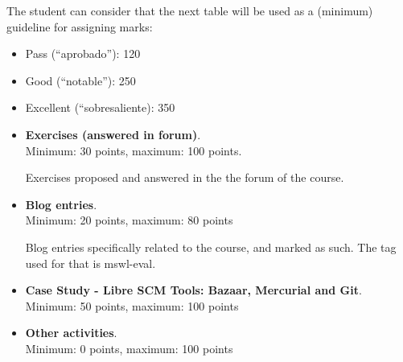 \documentclass[a4paper]{article}
\begin{document}
The student can consider that the next table will be used as a (minimum) guideline for 
assigning marks:

\begin{itemize}
\item Pass (``aprobado''): 120
\item Good (``notable''): 250
\item Excellent (``sobresaliente): 350
\end{itemize}

\begin{itemize}
\item \textbf{Exercises (answered in forum)}. \\
  Minimum: 30 points, maximum: 100 points.

  Exercises proposed and answered in the the forum of the course.

\item \textbf{Blog entries}. \\
  Minimum: 20 points, maximum: 80 points

  Blog entries specifically related to the course, and marked as such. The tag used for that is mswl-eval.

\item \textbf{Case Study - Libre SCM Tools: Bazaar, Mercurial and Git}. \\
  Minimum: 50 points, maximum: 100 points

\item \textbf{Other activities}. \\
  Minimum: 0 points, maximum: 100 points

\end{itemize}
\end{document}
